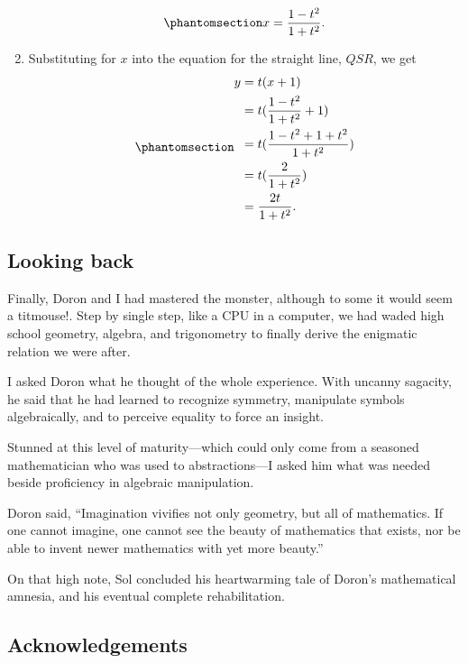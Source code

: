 \documentclass[
  a4paper,
]{article}
\begin{document}
\begin{enumerate}
  \begin{equation}\phantomsection\label{eq:forx}{
  x = \frac{1 - t^2}{1 + t^2}.
  }\end{equation}
\item
  Substituting for \(x\) into the equation for the straight line,
  \(QSR\), we get \begin{equation}\phantomsection\label{eq:fory}{
  \begin{aligned}
  y &= t(x + 1)\\
  &= t(\frac{1 - t^2}{1 + t^2} + 1)\\
  &= t(\frac{1 - t^2 + 1 + t^2}{1 + t^2})\\
  &= t(\frac{2}{1 + t^2})\\
  &= \frac{2t}{1 + t^2}.
  \end{aligned} 
  }\end{equation}
\end{enumerate}

\subsection{Looking back}\label{looking-back}

Finally, Doron and I had mastered the monster, although to some it would
seem a titmouse!. Step by single step, like a CPU in a computer, we had
waded high school geometry, algebra, and trigonometry to finally derive
the enigmatic relation we were after.

I asked Doron what he thought of the whole experience. With uncanny
sagacity, he said that he had learned to recognize symmetry, manipulate
symbols algebraically, and to perceive equality to force an insight.

Stunned at this level of maturity---which could only come from a
seasoned mathematician who was used to abstractions---I asked him what
was needed beside proficiency in algebraic manipulation.

Doron said, ``Imagination vivifies not only geometry, but all of
mathematics. If one cannot imagine, one cannot see the beauty of
mathematics that exists, nor be able to invent newer mathematics with
yet more beauty.''

On that high note, Sol concluded his heartwarming tale of Doron's
mathematical amnesia, and his eventual complete rehabilitation.

\subsection{Acknowledgements}\label{acknowledgements}
\end{document}
